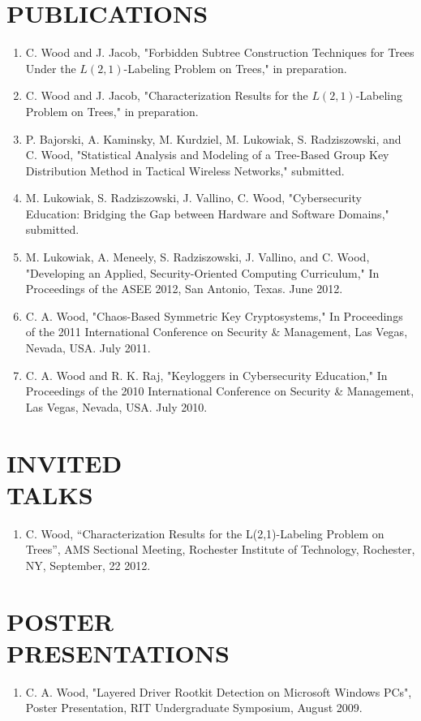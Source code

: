 \documentclass[line,margin]{res}
\begin{document}
\begin{resume}
\section{PUBLICATIONS}
	\begin{enumerate}
	\item C. Wood and J. Jacob, "Forbidden Subtree Construction Techniques for Trees Under the $L(2,1)$-Labeling Problem on Trees," in preparation.
	\item C. Wood and J. Jacob, "Characterization Results for the $L(2,1)$-Labeling Problem on Trees," in preparation.
	\item P. Bajorski, A. Kaminsky, M. Kurdziel, M. Lukowiak, S. Radziszowski, and C. Wood, "Statistical Analysis and Modeling of a Tree-Based Group Key Distribution Method in Tactical Wireless Networks," submitted.
	\item M. Lukowiak, S. Radziszowski, J. Vallino, C. Wood, "Cybersecurity Education: Bridging the Gap between Hardware and Software Domains," submitted.
	\item M. Lukowiak, A. Meneely, S. Radziszowski, J. Vallino, and C. Wood, "Developing an Applied, Security-Oriented Computing Curriculum," In Proceedings of the ASEE 2012, San Antonio, Texas. June 2012.
	\item C. A. Wood, "Chaos-Based Symmetric Key Cryptosystems," In Proceedings of the 2011 International Conference on Security \& Management, Las Vegas, Nevada, USA. July 2011.
	\item C. A. Wood and R. K. Raj, "Keyloggers in Cybersecurity Education," In Proceedings of the 2010 International Conference on Security \& Management, Las Vegas, Nevada, USA. July 2010.
	\end{enumerate}

\section{INVITED \\TALKS}
	\begin{enumerate}
		\item C. Wood, “Characterization Results for the L(2,1)-Labeling Problem on Trees”, AMS Sectional Meeting, Rochester Institute of Technology, Rochester, NY, September, 22 2012.	
	\end{enumerate}

\section{POSTER\\PRESENTATIONS}
	\begin{enumerate}
		\item C. A. Wood, "Layered Driver Rootkit Detection on Microsoft Windows PCs", Poster Presentation, RIT Undergraduate Symposium, August 2009.
	\end{enumerate}


\end{resume}
\end{document}
